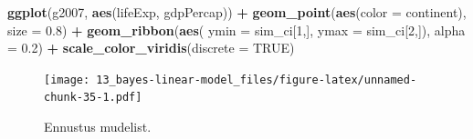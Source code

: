 \documentclass[]{book}
\newenvironment{Shaded}{\begin{snugshade}}{\end{snugshade}}
\newcommand{\CommentTok}[1]{\textcolor[rgb]{0.56,0.35,0.01}{\textit{#1}}}
\newcommand{\DataTypeTok}[1]{\textcolor[rgb]{0.13,0.29,0.53}{#1}}
\newcommand{\DecValTok}[1]{\textcolor[rgb]{0.00,0.00,0.81}{#1}}
\newcommand{\FloatTok}[1]{\textcolor[rgb]{0.00,0.00,0.81}{#1}}
\newcommand{\KeywordTok}[1]{\textcolor[rgb]{0.13,0.29,0.53}{\textbf{#1}}}
\newcommand{\NormalTok}[1]{#1}
\newcommand{\OperatorTok}[1]{\textcolor[rgb]{0.81,0.36,0.00}{\textbf{#1}}}
\newcommand{\OtherTok}[1]{\textcolor[rgb]{0.56,0.35,0.01}{#1}}
\newcommand{\StringTok}[1]{\textcolor[rgb]{0.31,0.60,0.02}{#1}}
\begin{document}
\begin{Shaded}
\end{Shaded}

\begin{Shaded}
\begin{Highlighting}[]
\KeywordTok{ggplot}\NormalTok{(g2007, }\KeywordTok{aes}\NormalTok{(lifeExp, gdpPercap)) }\OperatorTok{+}\StringTok{ }
\StringTok{  }\KeywordTok{geom_point}\NormalTok{(}\KeywordTok{aes}\NormalTok{(}\DataTypeTok{color =}\NormalTok{ continent), }\DataTypeTok{size =} \FloatTok{0.8}\NormalTok{) }\OperatorTok{+}
\StringTok{  }\KeywordTok{geom_ribbon}\NormalTok{(}\KeywordTok{aes}\NormalTok{( }\DataTypeTok{ymin =}\NormalTok{ sim_ci[}\DecValTok{1}\NormalTok{,], }\DataTypeTok{ymax =}\NormalTok{ sim_ci[}\DecValTok{2}\NormalTok{,]), }\DataTypeTok{alpha =} \FloatTok{0.2}\NormalTok{) }\OperatorTok{+}
\StringTok{  }\KeywordTok{scale_color_viridis}\NormalTok{(}\DataTypeTok{discrete =} \OtherTok{TRUE}\NormalTok{)}
\end{Highlighting}
\end{Shaded}

\begin{figure}
\centering
\texttt{[image: 13\_bayes-linear-model\_files/figure-latex/unnamed-chunk-35-1.pdf]}
\caption{\label{fig:unnamed-chunk-35}Ennustus mudelist.}
\end{figure}
\end{document}
